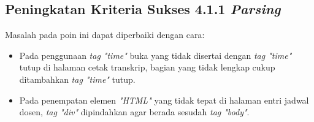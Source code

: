 \subsection{Peningkatan Kriteria Sukses 4.1.1 \textit{Parsing}}
\label{subsec:peningkatan_kriteria_sukses_4.1.1}
Masalah pada poin ini dapat diperbaiki dengan cara:

\begin{itemize}
    \item Pada penggunaan \textit{tag "time"} buka yang tidak disertai dengan \textit{tag "time"} tutup di halaman cetak transkrip, bagian yang tidak lengkap cukup ditambahkan \textit{tag "time"} tutup.
    \item Pada penempatan elemen \textit{"HTML"} yang tidak tepat di halaman entri jadwal dosen, \textit{tag "div"} dipindahkan agar berada sesudah \textit{tag "body"}.
\end{itemize}